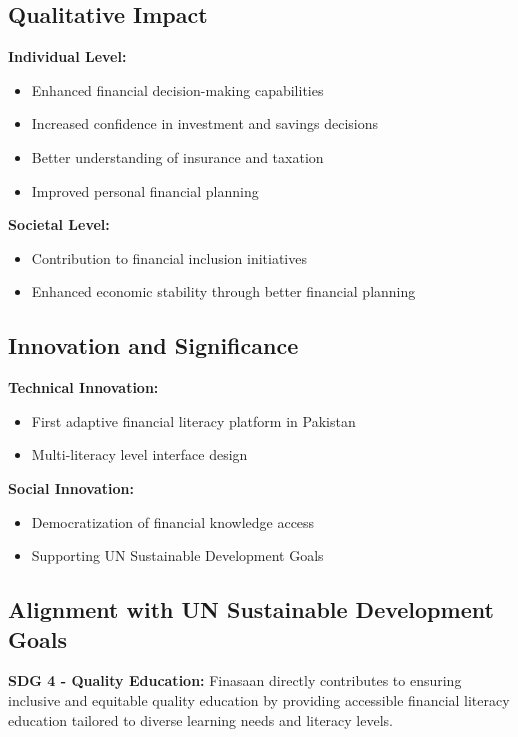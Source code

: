 \documentclass[12pt]{article}
\begin{document}
\subsection{Qualitative Impact}

\textbf{Individual Level:}
\begin{itemize}
    \item Enhanced financial decision-making capabilities
    \item Increased confidence in investment and savings decisions
    \item Better understanding of insurance and taxation
    \item Improved personal financial planning
\end{itemize}

\textbf{Societal Level:}
\begin{itemize}
    \item Contribution to financial inclusion initiatives
    \item Enhanced economic stability through better financial planning
\end{itemize}

\subsection{Innovation and Significance}

\textbf{Technical Innovation:}
\begin{itemize}
    \item First adaptive financial literacy platform in Pakistan
    \item Multi-literacy level interface design
\end{itemize}

\textbf{Social Innovation:}
\begin{itemize}
    \item Democratization of financial knowledge access
    \item Supporting UN Sustainable Development Goals
\end{itemize}

\subsection{Alignment with UN Sustainable Development Goals}

\textbf{SDG 4 - Quality Education:}
Finasaan directly contributes to ensuring inclusive and equitable quality education by providing accessible financial literacy education tailored to diverse learning needs and literacy levels.
\end{document}
